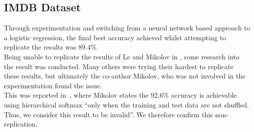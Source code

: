 \documentclass[11pt]{article}
\begin{document}
\subsection*{IMDB Dataset}
Through experimentation and switching from a neural network
based approach to a logistic regression, the final best accuracy
achieved whilst attempting to replicate the results was 89.4\%.\\
Being unable to replicate the results of Le and Mikolov in
\cite{le2014distributed}, some research into the result was
conducted. Many others were trying their hardest to replicate these
results, but ultimately the co-author Mikolov, who was not involved
in the experimentation found the issue.\\
This was reported in~\cite{mesnil2014ensemble}, where Mikolov
states the 92.6\% accuracy is achievable using hierarchical softmax
``only when the training and test data are not shuffled. Thus, we
consider this result to be invalid''. We therefore confirm this
non-replication.
\end{document}
